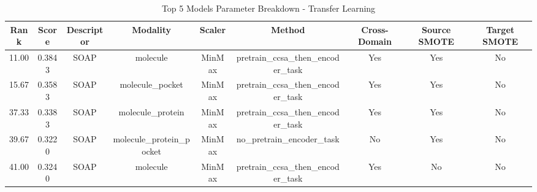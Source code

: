 \begin{table}[htbp]
\centering
\caption{Top 5 Models Parameter Breakdown - Transfer Learning}
\begin{tabular}{ccccccccc}
\toprule
\textbf{Rank} & \textbf{Score} & \textbf{Descriptor} & \textbf{Modality} & \textbf{Scaler} & \textbf{Method} & \textbf{Cross-Domain} & \textbf{Source SMOTE} & \textbf{Target SMOTE} \\
\midrule
11.00 & 0.3843 & SOAP & molecule & MinMax & pretrain\_ccsa\_then\_encoder\_task & Yes & Yes & No \\
15.67 & 0.3583 & SOAP & molecule\_pocket & MinMax & pretrain\_ccsa\_then\_encoder\_task & Yes & Yes & No \\
37.33 & 0.3383 & SOAP & molecule\_protein & MinMax & pretrain\_ccsa\_then\_encoder\_task & Yes & Yes & No \\
39.67 & 0.3220 & SOAP & molecule\_protein\_pocket & MinMax & no\_pretrain\_encoder\_task & No & Yes & No \\
41.00 & 0.3240 & SOAP & molecule & MinMax & pretrain\_ccsa\_then\_encoder\_task & Yes & No & No \\
\bottomrule
\end{tabular}
\label{tab:parameter_breakdown_transfer_learning}
\end{table}